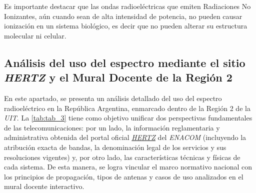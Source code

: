 \documentclass[12pt]{article}
\begin{document}
Es importante destacar que las ondas radioeléctricas que emiten Radiaciones No Ionizantes, aún cuando sean de alta intensidad de potencia, no pueden causar ionización en un sistema biológico, es decir que no pueden alterar su estructura molecular ni celular. \cite[p. 45]{b1}


\subsection{Análisis del uso del espectro mediante el sitio \textit{HERTZ} y el Mural Docente de la Región 2}
\label{sec_2.5}
En este apartado, se presenta un análisis detallado del uso del espectro radioeléctrico en la República Argentina, enmarcado dentro de la Región 2 de la \textit{UIT}. La \autoref{tab:tab_3} tiene como objetivo unificar dos perspectivas fundamentales de las telecomunicaciones: por un lado, la información reglamentaria y administrativa obtenida del portal oficial \href{https://hertz.enacom.gob.ar/se/portal/arg/publico/rf_SpectrumChart.php}{\textit{HERTZ}} del \textit{ENACOM} \cite{b11} (incluyendo la atribución exacta de bandas, la denominación legal de los servicios y sus resoluciones vigentes) y, por otro lado, las características técnicas y físicas de cada sistema. De esta manera, se logra vincular el marco normativo nacional con los principios de propagación, tipos de antenas y casos de uso analizados en el mural docente interactivo.
\end{document}
